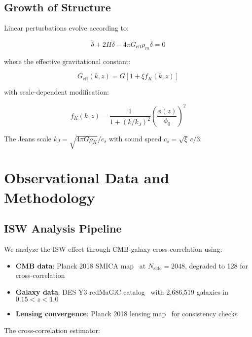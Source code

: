 \documentclass[aps,prd,twocolumn,showpacs,superscriptaddress,groupedaddress,nofootinbib]{revtex4-2}
\begin{document}
\subsection{Growth of Structure}

Linear perturbations evolve according to:

\begin{equation}
\ddot{\delta} + 2H\dot{\delta} - 4\pi G_{\text{eff}}\rho_m\delta = 0
\label{eq:growth}
\end{equation}

where the effective gravitational constant:

\begin{equation}
G_{\text{eff}}(k,z) = G\left[1 + \xi f_K(k,z)\right]
\end{equation}

with scale-dependent modification:

\begin{equation}
f_K(k,z) = \frac{1}{1 + (k/k_J)^2}\left(\frac{\phi(z)}{\phi_0}\right)^2
\label{eq:scale_dep}
\end{equation}

The Jeans scale $k_J = \sqrt{4\pi G\rho_K}/c_s$ with sound speed $c_s = \sqrt{\xi}\,c/3$.

\section{Observational Data and Methodology}
\label{sec:data}

\subsection{ISW Analysis Pipeline}

We analyze the ISW effect through CMB-galaxy cross-correlation using:

\begin{itemize}
\item \textbf{CMB data}: Planck 2018 SMICA map~\cite{Planck2018} at $N_{\text{side}} = 2048$, degraded to 128 for cross-correlation
\item \textbf{Galaxy data}: DES Y3 redMaGiC catalog~\cite{DES2022} with 2,686,519 galaxies in $0.15 < z < 1.0$
\item \textbf{Lensing convergence}: Planck 2018 lensing map~\cite{Planck2018_lensing} for consistency checks
\end{itemize}

The cross-correlation estimator:
\end{document}
